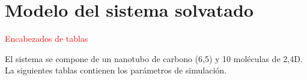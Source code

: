 \chapter{Modelo del sistema solvatado}\label{chapter:apendicea}

\textcolor{red}{Encabezados de tablas}








El sistema se compone de un nanotubo de carbono (6,5) y 10 moléculas de 2,4D. La siguientes tablas contienen los parámetros de simulación.

